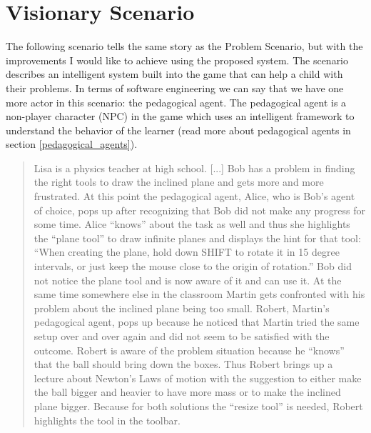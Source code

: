 
\section{Visionary Scenario}
\label{visionary_scenario}
The following scenario tells the same story as the Problem Scenario, but with the
improvements I would like to achieve using the proposed system. The scenario
describes an intelligent system built into the game that can help a child
with their problems. In terms of software engineering we can say that we have
one more actor in this scenario: the pedagogical agent. The pedagogical agent
is a non-player character (NPC) in the game which uses an intelligent
framework to understand the behavior of the learner (read more about pedagogical
agents in section \ref{pedagogical_agents}).

\begin{quote}
Lisa is a physics teacher at high school. [...]
Bob has a problem in finding the right tools to draw the inclined
plane and gets more and more frustrated. At this point the pedagogical
agent, Alice, who is Bob's agent of choice, pops
up after recognizing that Bob did not make any progress for some time.
Alice ``knows'' about the task as well and thus she highlights the
``plane tool'' to draw infinite planes and
displays the hint for that tool: ``When creating the
plane, hold down SHIFT to rotate it in 15 degree intervals, or just keep
the mouse close to the origin of rotation.'' Bob did
not notice the plane tool and is now aware of it and can use it.
At the same time somewhere else in the classroom Martin gets confronted
with his problem about the inclined plane being too small. Robert,
Martin's pedagogical agent, pops up because he noticed that Martin
tried the same setup over and over again and did not seem to be satisfied
with the outcome. Robert is aware of the problem situation because
he ``knows'' that the ball should bring down the boxes. Thus Robert brings
up a lecture about Newton's Laws of motion with the suggestion to either make
the ball bigger and heavier to have more mass or to make the inclined
plane bigger. Because for both solutions the ``resize
tool'' is needed, Robert highlights the tool in the toolbar.
\end{quote}

